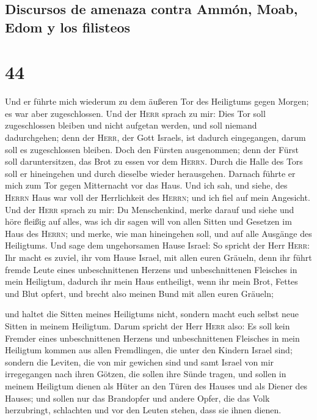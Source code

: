 \hypertarget{discursos-de-amenaza-contra-ammuxf3n-moab-edom-y-los-filisteos}{%
\subsection{Discursos de amenaza contra Ammón, Moab, Edom y los
filisteos}\label{discursos-de-amenaza-contra-ammuxf3n-moab-edom-y-los-filisteos}}

\hypertarget{section-43}{%
\section{44}\label{section-43}}

 Und er führte mich wiederum zu dem äußeren Tor des
Heiligtums gegen Morgen; es war aber zugeschlossen.  Und
der \textsc{Herr} sprach zu mir: Dies Tor soll zugeschlossen bleiben und
nicht aufgetan werden, und soll niemand dadurchgehen; denn der
\textsc{Herr}, der Gott Israels, ist dadurch eingegangen, darum soll es
zugeschlossen bleiben.  Doch den Fürsten ausgenommen; denn
der Fürst soll daruntersitzen, das Brot zu essen vor dem \textsc{Herrn}.
Durch die Halle des Tors soll er hineingehen und durch dieselbe wieder
herausgehen.  Darnach führte er mich zum Tor gegen
Mitternacht vor das Haus. Und ich sah, und siehe, des \textsc{Herrn}
Haus war voll der Herrlichkeit des \textsc{Herrn}; und ich fiel auf mein
Angesicht.  Und der \textsc{Herr} sprach zu mir: Du
Menschenkind, merke darauf und siehe und höre fleißig auf alles, was ich
dir sagen will von allen Sitten und Gesetzen im Haus des \textsc{Herrn};
und merke, wie man hineingehen soll, und auf alle Ausgänge des
Heiligtums.  Und sage dem ungehorsamen Hause Israel: So
spricht der Herr \textsc{Herr}: Ihr macht es zuviel, ihr vom Hause
Israel, mit allen euren Gräueln,  denn ihr führt fremde
Leute eines unbeschnittenen Herzens und unbeschnittenen Fleisches in
mein Heiligtum, dadurch ihr mein Haus entheiligt, wenn ihr mein Brot,
Fettes und Blut opfert, und brecht also meinen Bund mit allen euren
Gräueln;

 und haltet die Sitten meines Heiligtums nicht, sondern
macht euch selbst neue Sitten in meinem Heiligtum.  Darum
spricht der Herr \textsc{Herr} also: Es soll kein Fremder eines
unbeschnittenen Herzens und unbeschnittenen Fleisches in mein Heiligtum
kommen aus allen Fremdlingen, die unter den Kindern Israel sind;
 sondern die Leviten, die von mir gewichen sind und samt
Israel von mir irregegangen nach ihren Götzen, die sollen ihre Sünde
tragen,  und sollen in meinem Heiligtum dienen als Hüter
an den Türen des Hauses und als Diener des Hauses; und sollen nur das
Brandopfer und andere Opfer, die das Volk herzubringt, schlachten und
vor den Leuten stehen, dass sie ihnen dienen.

